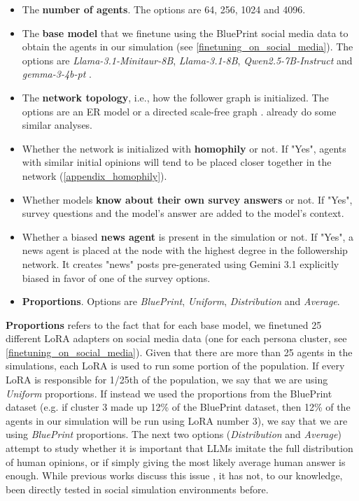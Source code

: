 \documentclass{article} %
\begin{document}
\begin{itemize}
    \item The \textbf{number of agents}. The options are 64, 256, 1024 and 4096.
    \item The \textbf{base model} that we finetune using the BluePrint social media data to obtain the agents in our simulation (see \ref{finetuning_on_social_media}). The options are \textit{Llama-3.1-Minitaur-8B}, \textit{Llama-3.1-8B}, \textit{Qwen2.5-7B-Instruct} and \textit{gemma-3-4b-pt} \citep{binz2024centaurfoundationmodelhuman,qwen2,gemma_2025}.
    \item The \textbf{network topology}, i.e., how the follower graph is initialized. The options are an ER model \citep{erdos1959randomgraphs} or a directed scale-free graph \citep{10.5555/644108.644133}. \citet{li2024largelanguagemodeldrivenmultiagent} already do some similar analyses.
    \item Whether the network is initialized with \textbf{homophily} or not. If "Yes", agents with similar initial opinions will tend to be placed closer together in the network (\ref{appendix_homophily}).
    \item Whether models \textbf{know about their own survey answers} or not. If "Yes", survey questions and the model's answer are added to the model's context.
    \item Whether a biased \textbf{news agent} is present in the simulation or not. If "Yes", a news agent is placed at the node with the highest degree in the followership network. It creates "news" posts pre-generated using Gemini 3.1 explicitly biased in favor of one of the survey options.
    \item \textbf{Proportions}. Options are \textit{BluePrint}, \textit{Uniform}, \textit{Distribution} and \textit{Average}.
\end{itemize}


\textbf{Proportions} refers to the fact that for each base model, we finetuned 25 different LoRA adapters on social media data (one for each persona cluster, see \ref{finetuning_on_social_media}). Given that there are more than 25 agents in the simulations, each LoRA is used to run some portion of the population. If every LoRA is responsible for 1/25th of the population, we say that we are using \textit{Uniform} proportions. If instead we used the proportions from the BluePrint dataset (e.g. if cluster 3 made up 12\% of the BluePrint dataset, then 12\% of the agents in our simulation will be run using LoRA number 3), we say that we are using \textit{BluePrint} proportions. The next two options (\textit{Distribution} and \textit{Average}) attempt to study whether it is important that LLMs imitate the full distribution of human opinions, or if simply giving the most likely average human answer is enough. While previous works discuss this issue \citep{jiang2025artificialhivemindopenendedhomogeneity}, it has not, to our knowledge, been directly tested in social simulation environments before.
\end{document}
